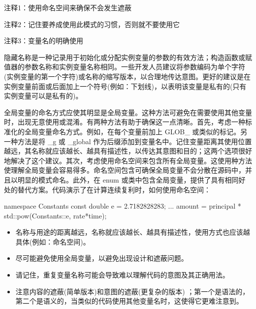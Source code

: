 {\footnotesize
注释1：使用命名空间来确保不会发生遮蔽

注释2：记住要养成使用此模式的习惯，否则就不要使用它

注释3：变量名的明确使用
}

隐藏名称是一种记录用于初始化或分配实例变量的参数的有效方法；构造函数或赋值器的参数名称和实例变量名称相同。一些开发人员建议将参数编码为单个字符(实例变量的第一个字符)或名称的缩写版本，以合理地传达意图。更好的建议是在实例变量前面或后面加上一个符号(例如：下划线)，以表明该变量是私有的(只有实例变量可以是私有的)。

全局变量的命名方式应使其明显是全局变量。这种方法可避免在需要使用其他变量时，出现无意使用或混淆。有两种方法有助于确保这一点清晰。首先，考虑一种标准化的全局变量命名方式。例如，在每个变量前加上 GLOB\_ 或类似的标记。另一种方法是将 \_g 或 \_global 作为后缀添加到变量名中。记住变量距离其使用位置越远，其名称就应该越长、越具有描述性，以传达其意图和目的；这两个选项很好地解决了这个建议。其次，考虑使用命名空间来包含所有全局变量。这使用种方法使理解全局变量会容易得多。命名空间包含可确保全局变量不会分散在源码中，并且以明显的模式命名。此外，在 enum 或类中包含全局变量，提供了具有相同好处的替代方案。代码演示了在计算连续复利时，如何使用命名空间：

\begin{cpp}
namespace Constants {
  const double e = 2.7182828283;
}
...
amount = principal * std::pow(Constants::e, rate*time);
\end{cpp}


\begin{itemize}
\item
名称与用途的距离越远，名称就应该越长、越具有描述性，使用方式也应该越具体(例如：命名空间)。

\item
尽可能避免使用全局变量，以避免出现设计和遮蔽问题。

\item
请记住，重复变量名称可能会导致难以理解代码的意图及其正确用法。

\item
注意内容的遮蔽(简单版本)和意图的遮蔽(更复杂的版本) ；第一个是语法的，第二个是语义的，当类似的代码使用其他变量名时，这使得它更难注意到。
\end{itemize}

